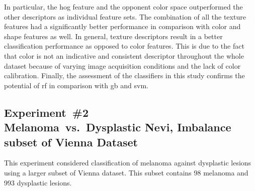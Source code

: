 In particular, the \ac{hog} feature and the opponent color space outperformed the other descriptors as individual feature sets.
The combination of all the texture features had a significantly better performance in comparison with color and shape features as well.
In general, texture descriptors result in a better classification performance as opposed to color features.
This is due to the fact that color is not an indicative and consistent descriptor throughout the whole dataset because of varying image acquisition conditions and the lack of color calibration.
Finally, the assessment of the classifiers in this study confirms the potential of \ac{rf} in comparison with \ac{gb} and \ac{svm}.

\subsection{Experiment~\#2\\
\small{Melanoma~vs.~Dysplastic Nevi, Imbalance subset of Vienna Dataset}}
This experiment considered classification of melanoma against dysplastic lesions using a larger subset of Vienna dataset.
This subset contains 98 melanoma and 993 dysplastic lesions.

